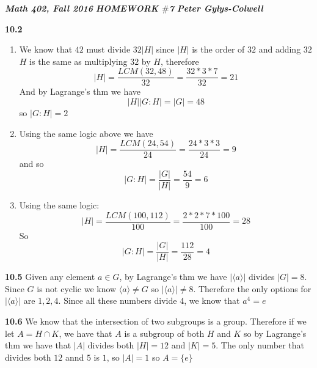 \documentclass[12pt]{article}
\newenvironment{ques}{\vspace{2 ex}}{\vspace{2 ex}}
\theoremstyle{definition}
\begin{document}
\noindent \textit{\textbf{Math 402, Fall 2016}} \hspace{1.3cm}
\textit{\textbf{HOMEWORK $\#$7}} \hspace{1.3cm} \textit{\textbf{Peter
Gylys-Colwell}} 

\vspace{1cm}

\begin{ques}
	\textbf{10.2}
		\begin{enumerate}
			\item
				We know that $42$ must divide $32|H|$ since
				$|H|$ is the order of $32$ and adding $32$ $H$
				is the same as multiplying $32$ by $H$,
				therefore
				$$|H| = \frac{LCM(32,48)}{32} = \frac{32 * 3 *
				7}{32} = 21$$
				And by Lagrange's thm we have 
				$$|H||G:H| = |G| = 48$$
				so $|G:H| = 2$
			\item
				Using the same logic above we have
				$$|H| = \frac{LCM(24, 54)}{24} = \frac{24 * 3 *
				3}{24} = 9$$
				and so
				$$|G:H| = \frac{|G|}{|H|} = \frac{54}{9} = 6$$
			\item
				Using the same logic:
				$$|H| = \frac{LCM(100,112)}{100} = \frac{2 * 2
				* 7 * 100}{100} = 28$$
				So 
				$$|G:H| = \frac{|G|}{|H|} = \frac{112}{28} = 4$$
		\end{enumerate}

\end{ques}

\begin{ques}
	\textbf{10.5}
		Given any element $a \in G$, by Lagrange's thm we have $|\langle
		a \rangle|$ divides $|G| = 8$. Since $G$ is not cyclic we know
		$\langle a \rangle \neq G$ so $|\langle a \rangle| \neq 8$.
		Therefore the only options for $|\langle a \rangle|$ are $1, 2,
		4$. Since all these numbers divide $4$, we know that $a^4 = e$

\end{ques}

\begin{ques}
	\textbf{10.6}
		We know that the intersection of two subgroups is a group.
		Therefore if we let $A = H \cap K$, we have that $A$ is a
		subgroup of both $H$ and $K$ so by Lagrange's thm we have that
		$|A|$ divides both $|H| = 12$ and $|K| = 5$. The only number
		that divides both $12$ annd $5$ is $1$, so $|A| = 1$ so $A =
		\{e\}$

\end{ques}
\end{document}

